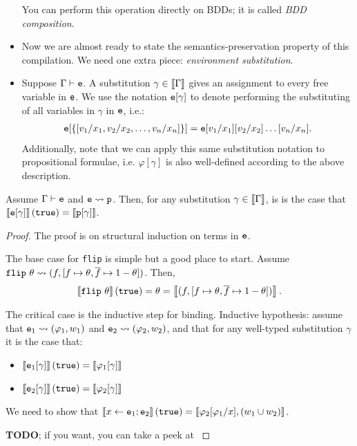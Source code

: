 \documentclass{tufte-handout}
\begin{document}
\begin{itemize}
  You can perform this operation directly on BDDs; it is called \emph{BDD
  composition}.

  \item Now we are almost ready to state the semantics-preservation property of
  this compilation. We need one extra piece: \emph{environment substitution}.
  \item Suppose $\Gamma \vdash \texttt{e}$. A substitution $\gamma \in \left \llbracket {\Gamma} \right \rrbracket$ 
  gives an assignment to every free variable in $\texttt{e}$. We use the notation 
  $\texttt{e}[\gamma]$ to denote performing the substituting of all variables 
  in $\gamma$ in $\texttt{e}$, i.e.:
  \begin{align*}
    \texttt{e}[\{[v_1/x_1, v_2/x_2, \dots, v_n/x_n]\}] = \texttt{e}[v_1/x_1][v_2/x_2]\dots[v_n/x_n].
  \end{align*}
  Additionally, note that we can apply this same substitution notation to 
  propositional formulae, i.e. $\varphi[\gamma]$ is also well-defined 
  according to the above description.
\end{itemize}

\begin{theorem}
Assume $\Gamma \vdash \texttt{e}$ and $\texttt{e} \rightsquigarrow \texttt{p}$. Then, for any substitution
$\gamma \in \left \llbracket {\Gamma} \right \rrbracket$, is is the case that 
$\left \llbracket {\texttt{e}[\gamma]} \right \rrbracket(\texttt{true}) = \left \llbracket {\texttt{p}[\gamma]} \right \rrbracket$.
\end{theorem}
\begin{proof}
  The proof is on structural induction on terms in $\texttt{e}$. 

  The base case for \texttt{flip} is simple but a good place to start. Assume $\texttt{flip}~\theta 
  \rightsquigarrow (f, [f \mapsto \theta, \overline{f} \mapsto 1-\theta])$. Then,
  \begin{align*}
    \left \llbracket {\texttt{flip}~\theta} \right \rrbracket(\texttt{true}) = \theta =  \left \llbracket {(f, [f \mapsto \theta, \overline{f} \mapsto 1-\theta])} \right \rrbracket.
  \end{align*}

  The critical case is the inductive step for binding. Inductive hypothesis:
  assume that $\texttt{e}_1 \rightsquigarrow (\varphi_1, w_1)$ and $\texttt{e}_2 \rightsquigarrow (\varphi_2, w_2)$, 
  and that for any well-typed substitution $\gamma$ it is the case that:
  \begin{itemize}
    \item $\left \llbracket {\texttt{e}_1[\gamma]} \right \rrbracket(\texttt{true}) = \left \llbracket {\varphi_1[\gamma]} \right \rrbracket$
    \item $\left \llbracket {\texttt{e}_2[\gamma]} \right \rrbracket(\texttt{true}) = \left \llbracket {\varphi_2[\gamma]} \right \rrbracket$
  \end{itemize}
  We need to show that $\left \llbracket {x \leftarrow \texttt{e}_1; \texttt{e}_2} \right \rrbracket(\texttt{true}) =
  \left \llbracket {\varphi_2[\varphi_1/x], (w_1 \cup w_2)} \right \rrbracket$.

  \textbf{TODO}; if you want, you can take a peek at \citet{holtzen2020scaling}

\end{proof}
\end{document}
